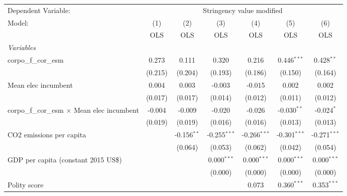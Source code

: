
\begingroup
\centering
\begin{tabular}{lcccccc}
   \toprule
   Dependent Variable: & \multicolumn{6}{c}{Stringency value modified}\\
   Model:                                              & (1)     & (2)           & (3)            & (4)            & (5)            & (6)\\  
                                                       &  OLS    & OLS           & OLS            & OLS            & OLS            & OLS\\  
   \midrule
   \emph{Variables}\\
   corpo\_f\_cor\_esm                                  & 0.273   & 0.111         & 0.320          & 0.216          & 0.446$^{***}$  & 0.428$^{**}$\\   
                                                       & (0.215) & (0.204)       & (0.193)        & (0.186)        & (0.150)        & (0.164)\\   
   Mean elec incumbent                                 & 0.004   & 0.003         & -0.003         & -0.015         & 0.002          & 0.002\\   
                                                       & (0.017) & (0.017)       & (0.014)        & (0.012)        & (0.011)        & (0.012)\\   
   corpo\_f\_cor\_esm $\times$ Mean elec incumbent     & -0.004  & -0.009        & -0.020         & -0.026         & -0.030$^{**}$  & -0.024$^{*}$\\   
                                                       & (0.019) & (0.019)       & (0.016)        & (0.016)        & (0.013)        & (0.013)\\   
   CO2 emissions per capita                            &         & -0.156$^{**}$ & -0.255$^{***}$ & -0.266$^{***}$ & -0.301$^{***}$ & -0.271$^{***}$\\   
                                                       &         & (0.064)       & (0.053)        & (0.062)        & (0.042)        & (0.054)\\   
   GDP per capita (constant 2015 US\$)                 &         &               & 0.000$^{***}$  & 0.000$^{***}$  & 0.000$^{***}$  & 0.000$^{***}$\\   
                                                       &         &               & (0.000)        & (0.000)        & (0.000)        & (0.000)\\   
   Polity score                                        &         &               &                & 0.073          & 0.360$^{***}$  & 0.353$^{***}$\\   

\end{tabular}
